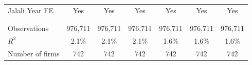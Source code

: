 \documentclass[border=0.2cm]{standalone}
\begin{document}
\begin{tabular}{lcccccc}
    Jalali Year FE         & Yes                                            & Yes                                            & Yes                                            & Yes                                             & Yes                                            & Yes                                            \\
    \vspace{4pt}           &                                                &                                                &                                                &                                                 &                                                &                                                \\
    \vspace{4pt}           & \begin{footnotesize}\end{footnotesize}         & \begin{footnotesize}\end{footnotesize}         & \begin{footnotesize}\end{footnotesize}         & \begin{footnotesize}\end{footnotesize}          & \begin{footnotesize}\end{footnotesize}         & \begin{footnotesize}\end{footnotesize}         \\
    Observations           & 976,711                                        & 976,711                                        & 976,711                                        & 976,711                                         & 976,711                                        & 976,711                                        \\
    $R^2$                  & 2.1\%                                          & 2.1\%                                          & 2.1\%                                          & 1.6\%                                           & 1.6\%                                          & 1.6\%                                          \\
    Number of firms        & 742                                            & 742                                            & 742                                            & 742                                             & 742                                            & 742                                            \\

\end{tabular}
\end{document}
